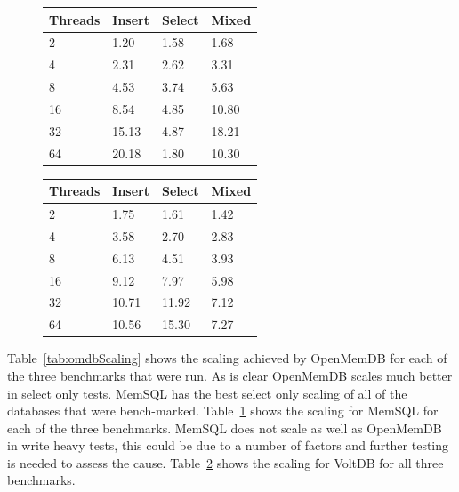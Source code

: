 \documentclass[conference, compsoc]{IEEEtran}
\begin{document}
\par\vspace{\baselineskip}
\begin{figure}[H]
\begin{center}
 \label{tab:memsqlScaling}
  \begin{tabular}{  l  l  l  l }
    \midrule
    \bf Threads & \bf Insert & \bf Select & \bf Mixed \\ \midrule
     2 & 1.20 & 1.58 & 1.68 \\ \midrule
     4 & 2.31 & 2.62 & 3.31 \\ \midrule
     8 & 4.53 & 3.74 & 5.63 \\ \midrule
     16 & 8.54 & 4.85 & 10.80 \\ \midrule
     32 & 15.13 & 4.87 & 18.21 \\ \midrule
     64 & 20.18 & 1.80 & 10.30 \\ \midrule
  \end{tabular}
\end{center}
\end{figure}

\par\vspace{\baselineskip}
\begin{figure}[H]
\begin{center}
 \label{tab:voltScaling}
  \begin{tabular}{  l  l  l  l }
    \midrule
    \bf Threads & \bf Insert & \bf Select & \bf Mixed \\ \midrule
     2 & 1.75 & 1.61 & 1.42 \\ \midrule
     4 & 3.58 & 2.70 & 2.83 \\ \midrule
     8 & 6.13 & 4.51 & 3.93 \\ \midrule
     16 & 9.12 & 7.97 & 5.98 \\ \midrule
     32 & 10.71 & 11.92 & 7.12 \\ \midrule
     64 & 10.56 & 15.30 & 7.27 \\ \midrule
  \end{tabular}
\end{center}
\end{figure}


Table~\ref{tab:omdbScaling} shows the scaling achieved by OpenMemDB for each of the three
benchmarks that were run. As is clear OpenMemDB scales much better in select only tests. 
MemSQL has the best select only scaling of all of the databases that were bench-marked.  
Table~\ref{tab:memsqlScaling} shows the scaling for MemSQL for each of the three benchmarks. 
MemSQL does not scale as well as OpenMemDB in write heavy tests, this could be due to a number of factors
and further testing is needed to assess the cause.
Table~\ref{tab:voltScaling} shows the scaling for VoltDB for all three benchmarks.
\end{document}

